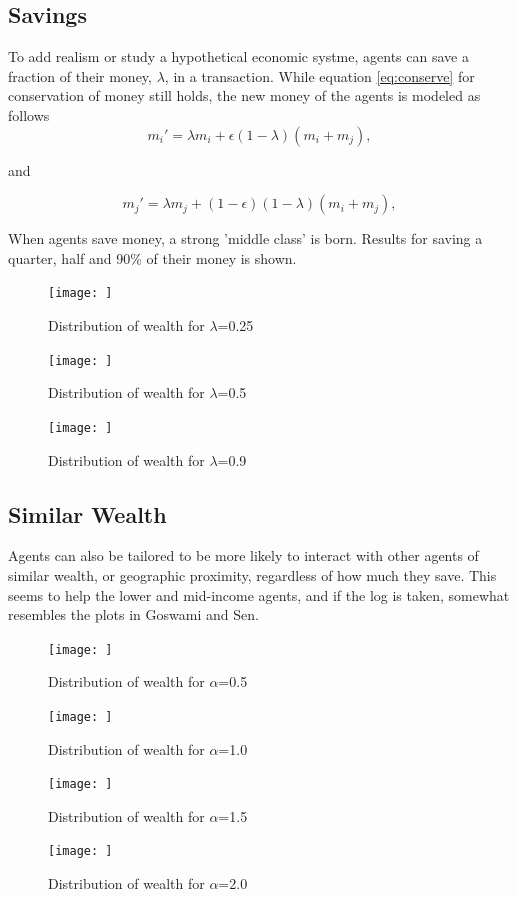 \documentclass[12pt]{article} %
\begin{document}
\subsection{Savings}
To add realism or study a hypothetical economic systme, agents can save a
fraction of their money, $\lambda$, in a transaction. While equation
\eqref{eq:conserve} for conservation of money still holds, the new money of
the agents is modeled as follows
\begin{equation*}
  m_i' = \lambda m_i+\epsilon(1-\lambda)(m_i+m_j),
\end{equation*}

and

\begin{equation*}
  m_j' = \lambda m_j+(1-\epsilon)(1-\lambda)(m_i+m_j),
\end{equation*}

When agents save money, a strong 'middle class' is born. Results for saving a
quarter, half and 90\% of their money is shown.

\begin{figure}
	\texttt{[image: ]}
	\caption{Distribution of wealth for $\lambda$=0.25}
	\label{}
\end{figure}


\begin{figure}
	\texttt{[image: ]}
	\caption{Distribution of wealth for $\lambda$=0.5}
	\label{}
\end{figure}
\begin{figure}
	\texttt{[image: ]}
	\caption{Distribution of wealth for $\lambda$=0.9}
	\label{}
\end{figure}

\subsection{Similar Wealth}
Agents can also be tailored to be more likely to interact with other agents of
similar wealth, or geographic proximity, regardless of how much they save. This seems to help the lower and
mid-income agents, and if the log is taken, somewhat resembles the plots in
Goswami and Sen\cite{Goswami}.

\begin{figure}
	\texttt{[image: ]}
	\caption{Distribution of wealth for $\alpha$=0.5}
	\label{}
\end{figure}

\begin{figure}
	\texttt{[image: ]}
	\caption{Distribution of wealth for $\alpha$=1.0}
	\label{}
\end{figure}
\begin{figure}
	\texttt{[image: ]}
	\caption{Distribution of wealth for $\alpha$=1.5}
	\label{}
\end{figure}
\begin{figure}
	\texttt{[image: ]}
	\caption{Distribution of wealth for $\alpha$=2.0}
	\label{}
\end{figure}
\end{document}
